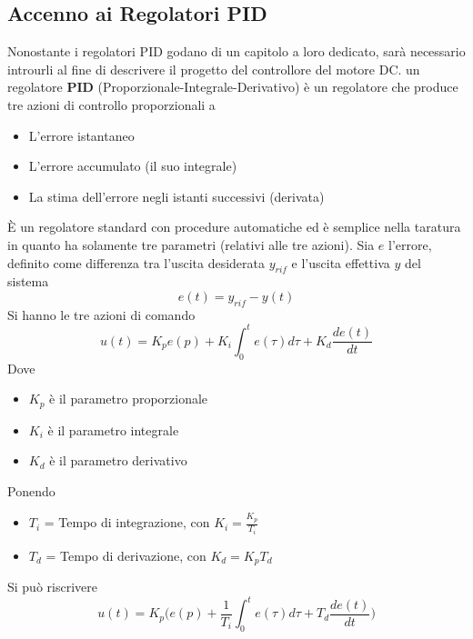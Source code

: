 \documentclass[10pt, letterpaper]{report}
\begin{document}
\subsection{Accenno ai Regolatori PID}
Nonostante i regolatori PID godano di un capitolo a loro dedicato, sarà necessario introurli al fine di descrivere il progetto del controllore del motore DC.\acc 
{} un regolatore \textbf{PID} (Proporzionale-Integrale-Derivativo) è un regolatore che produce tre azioni di controllo proporzionali a \begin{itemize}
    \item L'errore istantaneo 
    \item L'errore accumulato (il suo integrale)
    \item La stima dell'errore negli istanti successivi (derivata)
\end{itemize}
È un regolatore standard con procedure automatiche ed è semplice nella taratura in quanto ha solamente tre parametri (relativi alle tre azioni). \acc 
Sia $e$ l'errore, definito come differenza tra l'uscita desiderata $y_{rif}$ e l'uscita effettiva $y$ del sistema 
$$ e(t)=y_{rif}-y(t)$$
Si hanno le tre azioni di comando 
$$ u(t)=K_pe(p)+K_i\int_0^t e(\tau)d\tau+K_d\frac{de(t)}{dt}$$
Dove \begin{itemize}
    \item $K_p$ è il parametro proporzionale 
    \item $K_i$ è il parametro integrale 
    \item $K_d$ è il parametro derivativo 
\end{itemize}
Ponendo \begin{itemize}
\item $T_i$ = Tempo di integrazione, con $K_i=\frac{K_p}{T_i}$
\item $T_d$ = Tempo di derivazione, con $K_d=K_pT_d$
\end{itemize}
Si può riscrivere
$$ u(t)=K_p\Big(e(p)+\frac{1}{T_i}\int_0^t e(\tau)d\tau+T_d\frac{de(t)}{dt}\Big)$$
\end{document}
